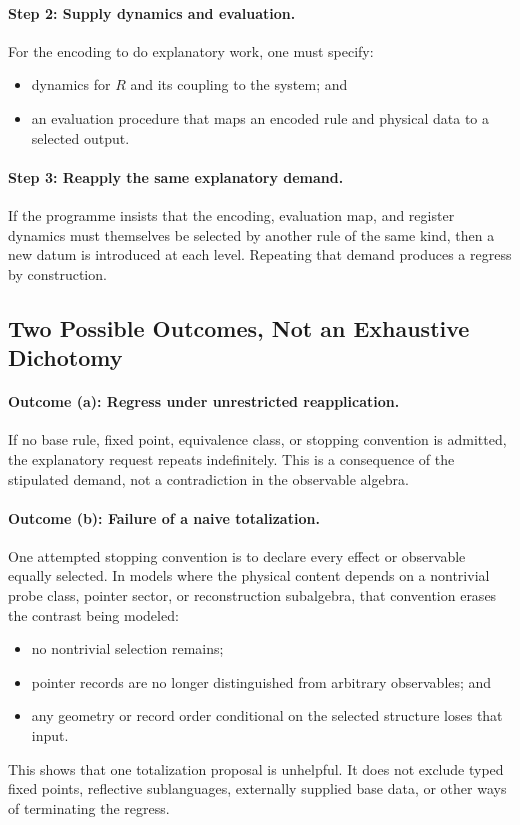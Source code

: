 \documentclass[12pt,a4paper]{article}
\begin{document}
\paragraph{Step 2: Supply dynamics and evaluation.}
For the encoding to do explanatory work, one must specify:
\begin{itemize}
    \item dynamics for $R$ and its coupling to the system; and
    \item an evaluation procedure that maps an encoded rule and physical data to a selected output.
\end{itemize}

\paragraph{Step 3: Reapply the same explanatory demand.}
If the programme insists that the encoding, evaluation map, and register dynamics must themselves be selected by another rule of the same kind, then a new datum is introduced at each level.  Repeating that demand produces a regress by construction.

\subsection{Two Possible Outcomes, Not an Exhaustive Dichotomy}

\paragraph{Outcome (a): Regress under unrestricted reapplication.}
If no base rule, fixed point, equivalence class, or stopping convention is admitted, the explanatory request repeats indefinitely.  This is a consequence of the stipulated demand, not a contradiction in the observable algebra.

\paragraph{Outcome (b): Failure of a naive totalization.}
One attempted stopping convention is to declare every effect or observable equally selected.  In models where the physical content depends on a nontrivial probe class, pointer sector, or reconstruction subalgebra, that convention erases the contrast being modeled:
\begin{itemize}
    \item no nontrivial selection remains;
    \item pointer records are no longer distinguished from arbitrary observables; and
    \item any geometry or record order conditional on the selected structure loses that input.
\end{itemize}
This shows that one totalization proposal is unhelpful.  It does not exclude typed fixed points, reflective sublanguages, externally supplied base data, or other ways of terminating the regress.
\end{document}
